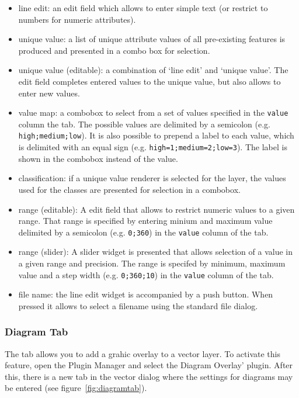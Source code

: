 \begin{itemize}
\item line edit: an edit field which allows to enter simple text (or restrict to 
numbers for numeric attributes).
\item unique value: a list of unique attribute values of all pre-existing features
is produced and presented in a combo box for selection.
\item  unique value (editable): a combination of `line edit' and `unique value'.
The edit field completes entered values to the unique value, but also allows
to enter new values.
\item value map: a combobox to select from a set of values specified in the
\texttt{value} column the  tab.  The possible values are 
delimited by a semicolon (e.g. \verb|high;medium;low|).  It is also possible
to prepend a label to each value, which is delimited with an equal sign (e.g.
\verb|high=1;medium=2;low=3|). The label is shown in the combobox instead of
the value.
\item classification: if a unique value renderer is selected for the layer, the
values used for the classes are presented for selection in a combobox.
\item range (editable): A edit field that allows to restrict numeric values to a
given range.  That range is specified by entering minium and maximum value
delimited by a semicolon (e.g. \verb|0;360|) in the \texttt{value} column of
the  tab.
\item range (slider): A slider widget is presented that allows selection of a value
in a given range and precision.  The range is specifed by minimum, maximum
value and a step width (e.g. \verb|0;360;10|) in the \texttt{value} column of
the  tab.
\item file name: the line edit widget is accompanied by a push button. When pressed
it allows to select a filename using the standard file dialog.
\end{itemize}

\subsubsection{Diagram Tab}\label{sec:diagram}

The  tab allows you to add a grahic overlay to a vector layer.
To activate this feature, open the Plugin Manager and select the Diagram Overlay' 
plugin. After this, there is a new tab in the vector  dialog where the settings for diagrams may be entered (see
figure~\ref{fig:diagramtab}).

